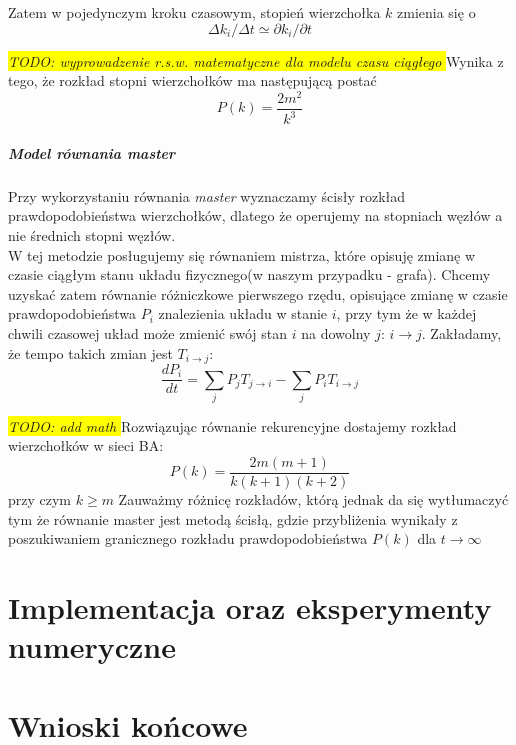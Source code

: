 \documentclass{article}
\newcommand{\todo}[1]{
	\colorbox{yellow} {{\color{red}
	\emph {TODO: #1}
}}}
\def\lecturemark{}
\newcommand{\spr}[1]{\part{#1}\def\lecturemark{\partname\ \thepart: #1}}
\renewcommand{\partname}{Sprawozdanie}
\renewcommand{\thepart}{\arabic{part}}
\begin{document}
	Zatem w pojedynczym kroku czasowym, stopień wierzchołka $k$ zmienia się o
	\begin{equation}
	\Delta k_i/\Delta t \simeq \partial k_i / \partial t
	\end{equation}
		\todo{wyprowadzenie r.s.w. matematyczne dla modelu czasu ciągłego}
	Wynika z tego, że rozkład stopni wierzchołków ma następującą postać
	\begin{equation}
	P(k) = \frac{2m^2}{k^3}
	\end{equation}
\subsubsection{Model równania \textit{master}}
	Przy wykorzystaniu równania \textit{master} wyznaczamy ścisły rozkład prawdopodobieństwa wierzchołków, dlatego że operujemy na stopniach węzłów a nie średnich stopni węzłów.\\W tej metodzie posługujemy się równaniem mistrza, które opisuję zmianę w czasie ciągłym  stanu układu fizycznego(w naszym przypadku - grafa). Chcemy uzyskać zatem równanie różniczkowe pierwszego rzędu, opisujące zmianę w czasie prawdopodobieństwa $P_i$ znalezienia układu w stanie $i$, przy tym że w każdej chwili czasowej układ może zmienić swój stan $i$ na dowolny $j$: $ i \rightarrow j$. Zakładamy, że tempo takich zmian jest $T_{i \rightarrow j}$:
	\begin{equation}
	\frac{dP_i}{dt} = \sum_{j} P_jT_{j \rightarrow i} - \sum_{j} P_iT_{i \rightarrow j}
	\end{equation}
	\todo{add math}
	Rozwiązując równanie rekurencyjne dostajemy rozkład wierzchołków w sieci BA:
	\begin{equation}
		P(k) = \frac{2m(m + 1)}{k(k + 1)(k + 2)}
	\end{equation}
	przy czym $k \geq m$
Zauważmy różnicę rozkładów, którą jednak da się wytłumaczyć tym że równanie master jest metodą ścisłą, gdzie przybliżenia wynikały z poszukiwaniem granicznego rozkładu prawdopodobieństwa $P(k)$ dla $t \rightarrow \infty$
\spr{Implementacja oraz eksperymenty numeryczne}
\spr{Wnioski końcowe}
{}

\end{document}
